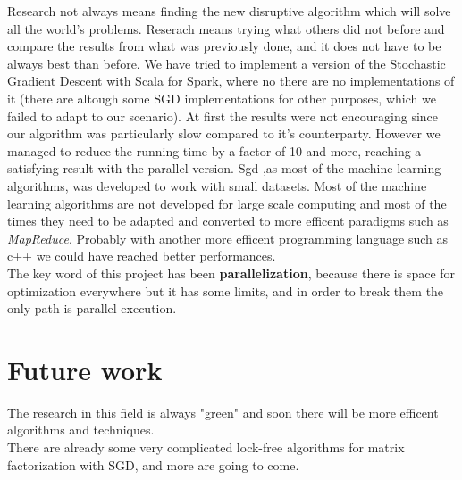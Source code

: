 \documentclass{sig-alternate-05-2015}
\begin{document}
Research not always means finding the new disruptive algorithm
which will solve all the world's problems. Reserach means
trying what others did not before and compare the results from
what was previously done, and it does not have to be always best
than before. We have tried to implement a version of the Stochastic
Gradient Descent with Scala for Spark, where no there are no implementations
of it (there are altough some SGD implementations for other purposes, which we failed to adapt
to our scenario). At first the results were not encouraging since
our algorithm was particularly slow compared to it's counterparty.
However we managed to reduce the running time by a factor of 10 and more,
reaching a satisfying result with the parallel version. Sgd ,as most of the
machine learning algorithms, was developed to work with small
 datasets. Most of the machine learning algorithms are not developed for
large scale computing and most of the times they need to be adapted
and converted to more efficent paradigms such as \textit{MapReduce}.
Probably with another more efficent programming language such as c++ we could have
reached better performances.\\
The key word of this project has been \textbf{parallelization}, because there is
space for optimization everywhere but it has some limits, and in order
to break them the only path is parallel execution.

\section{Future work}

The research in this field is always "green" and soon there will be more
efficent algorithms and techniques.\\
There are already some very complicated lock-free algorithms for matrix factorization
with SGD, and more are going to come.



%

%
%
\appendix
\end{document}
